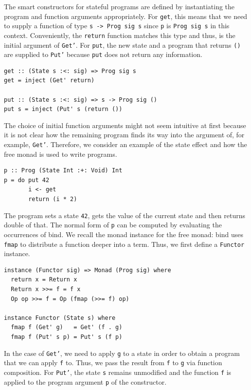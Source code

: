 \documentclass[a4paper, 11pt, fleqn, twoside, abstract=on]{scrreprt}
\newcommand{\hinl}[1]{\texttt{#1}}
\begin{document}
The smart constructors for stateful programs are defined by instantiating the program and function arguments appropriately.
For \hinl{get}, this means that we need to supply a function of type \hinl{s -> Prog sig s} since \hinl{p} is \hinl{Prog sig s} in this context.
Conveniently, the \hinl{return} function matches this type and thus, is the initial argument of \hinl{Get'}.
For \hinl{put}, the new state and a program that returns \hinl{()} are supplied to \hinl{Put'} because \hinl{put} does not return any information.

\begin{verbatim}
get :: (State s :<: sig) => Prog sig s
get = inject (Get' return)

put :: (State s :<: sig) => s -> Prog sig ()
put s = inject (Put' s (return ())
\end{verbatim}

The choice of initial function arguments might not seem intuitive at first because it is not clear how the remaining program finds its way into the argument of, for example, \hinl{Get'}.
Therefore, we consider an example of the state effect and how the free monad is used to write programs.

\begin{verbatim}
p :: Prog (State Int :+: Void) Int
p = do put 42
       i <- get
       return (i * 2)
\end{verbatim}

The program sets a state \hinl{42}, gets the value of the current state and then returns double of that.
The normal form of \hinl{p} can be computed by evaluating the occurrences of bind.
We recall the monad instance for the free monad: bind uses \hinl{fmap} to distribute a function deeper into a term.
Thus, we first define a \hinl{Functor} instance.

\begin{verbatim}
instance (Functor sig) => Monad (Prog sig) where
  return x = Return x
  Return x >>= f = f x
  Op op >>= f = Op (fmap (>>= f) op)

instance Functor (State s) where
  fmap f (Get' g)   = Get' (f . g)
  fmap f (Put' s p) = Put' s (f p)
\end{verbatim}

In the case of \hinl{Get'}, we need to apply \hinl{g} to a state in order to obtain a program that we can apply \hinl{f} to.
Thus, we pass the result from \hinl{f} to \hinl{g} via function composition.
For \hinl{Put'}, the state \hinl{s} remains unmodified and the function \hinl{f} is applied to the program argument \hinl{p} of the constructor.
\end{document}
